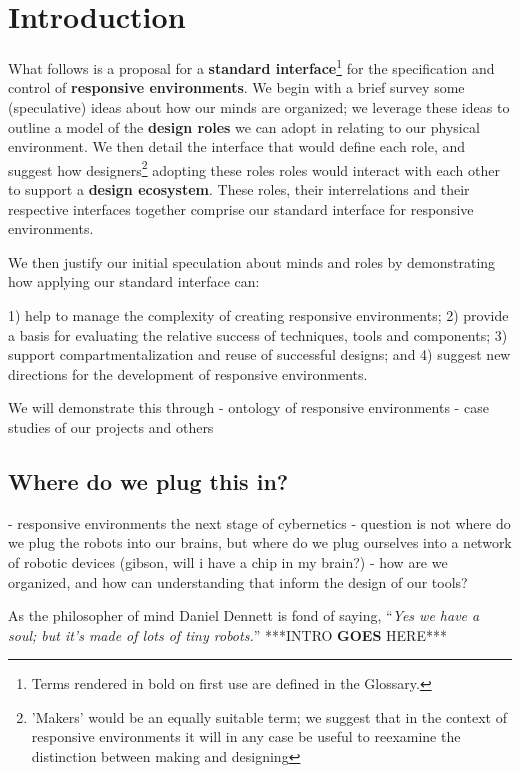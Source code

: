 \section{Introduction}
%
What follows is a proposal for a {\bf standard interface}\footnote{Terms rendered in bold on first use are defined in the Glossary.} for the specification and control of {\bf responsive environments}. We begin with a brief survey some (speculative) ideas about how our minds are organized; we leverage these ideas to outline a model of the {\bf design roles} we can adopt in relating to our physical environment. We then detail the interface that would define each role, and suggest how designers\footnote{'Makers' would be an equally suitable term; we suggest that in the context of responsive environments it will in any case be useful to reexamine the distinction between making and designing} adopting these roles roles would interact with each other to support a {\bf design ecosystem}. These roles, their interrelations and their respective interfaces together comprise our standard interface for responsive environments.

We then justify our initial speculation about minds and roles by demonstrating how applying our standard interface can:

1) help to manage the complexity of creating responsive environments;
2) provide a basis for evaluating the relative success of techniques, tools and components;
3) support compartmentalization and reuse of successful designs; and
4) suggest new directions for the development of responsive environments.

We will demonstrate this through
- ontology of responsive environments
- case studies of our projects and others

\subsection{Where do we plug this in?}
%
- responsive environments the next stage of cybernetics
- question is not where do we plug the robots into our brains, but where do we plug ourselves into a network of robotic devices (gibson, will i have a chip in my brain?)
- how are we organized, and how can understanding that inform the design of our tools?

As the philosopher of mind Daniel Dennett is fond of saying, ``\emph{Yes we have a soul; but it's made of lots of tiny robots.}'' \citeyearpar[p. 1]{freedom_evolves}
% 
***INTRO {\bf GOES} HERE*** \citep{society_of_mind}


